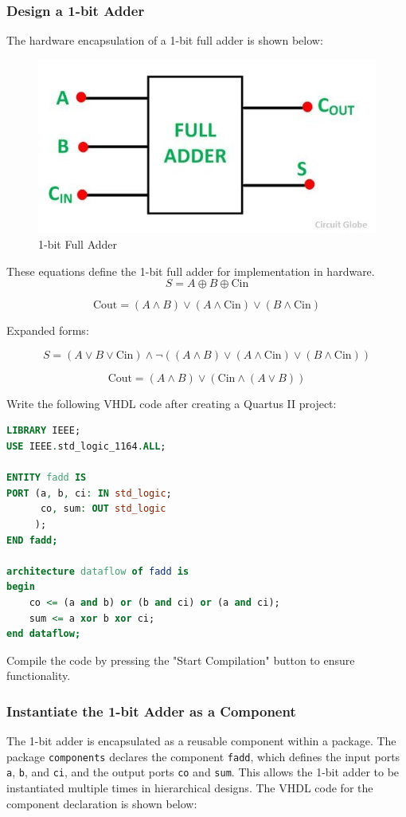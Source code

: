 \documentclass[12pt,a4paper,oneside]{ctexart}
\begin{document}
\subsubsection{Design a 1-bit Adder}
The hardware encapsulation of a 1-bit full adder is shown below:

\begin{figure}[h]
    \centering
    \includegraphics[width=0.6\linewidth]{1.jpg}
    \caption{1-bit Full Adder}
\end{figure}
These equations define the 1-bit full adder for implementation in hardware.
\[
S = A \oplus B \oplus \text{Cin}
\]

\[
\text{Cout} = (A \land B) \lor (A \land \text{Cin}) \lor (B \land \text{Cin})
\]

Expanded forms:

\[
S = (A \lor B \lor \text{Cin}) \land \neg((A \land B) \lor (A \land \text{Cin}) \lor (B \land \text{Cin}))
\]

\[
\text{Cout} = (A \land B) \lor (\text{Cin} \land (A \lor B))
\]

Write the following VHDL code after creating a Quartus II project:
\begin{lstlisting}[language=VHDL, caption=VHDL Code for 1-bit Full Adder, label=lst:fadd_code]
LIBRARY IEEE;
USE IEEE.std_logic_1164.ALL;

ENTITY fadd IS
PORT (a, b, ci: IN std_logic;
      co, sum: OUT std_logic
     );
END fadd;

architecture dataflow of fadd is
begin
    co <= (a and b) or (b and ci) or (a and ci);
    sum <= a xor b xor ci;
end dataflow;
\end{lstlisting}
Compile the code by pressing the "Start Compilation" button to ensure functionality.

\subsubsection{Instantiate the 1-bit Adder as a Component}
The 1-bit adder is encapsulated as a reusable component within a package. The package \texttt{components} declares the component \texttt{fadd}, which defines the input ports \texttt{a}, \texttt{b}, and \texttt{ci}, and the output ports \texttt{co} and \texttt{sum}. This allows the 1-bit adder to be instantiated multiple times in hierarchical designs. The VHDL code for the component declaration is shown below:
\end{document}
